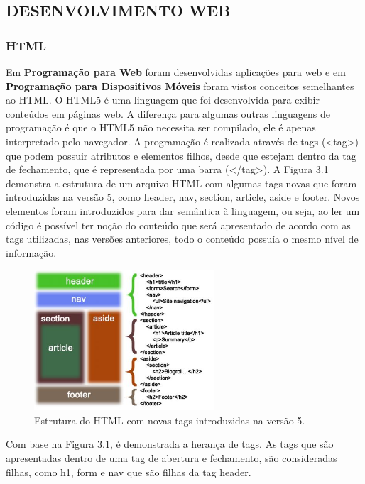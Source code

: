 \documentclass[
  12pt,				%
  openany,
  oneside,
  a4paper,			%
  english,			%
  brazil
]{article}
\numberwithin{figure}{section}
\numberwithin{table}{section}
\begin{document}
\subsection{DESENVOLVIMENTO WEB}

\subsubsection{HTML}

Em \textbf{Programação para Web} foram desenvolvidas aplicações para web e em \textbf{Programação para Dispositivos Móveis} foram vistos conceitos semelhantes ao HTML. O HTML5 é uma linguagem que foi desenvolvida para exibir conteúdos em páginas web. A diferença para algumas outras linguagens de programação é que o HTML5 não necessita ser compilado, ele é apenas interpretado pelo navegador. A programação é realizada através de tags (<tag>) que podem possuir atributos e elementos filhos, desde que estejam dentro da tag de fechamento, que é representada por uma barra (</tag>). A Figura 3.1 demonstra a estrutura de um arquivo HTML com algumas tags novas que foram introduzidas na versão 5, como header, nav, section, article, aside e footer. Novos elementos foram introduzidos para dar semântica à linguagem, ou seja, ao ler um código é possível ter noção do conteúdo que será apresentado de acordo com as tags utilizadas, nas versões anteriores, todo o conteúdo possuía o mesmo nível de informação.

\begin{figure}[!htb]
\centering
\includegraphics[width=0.6\textwidth]{figura31}
\caption{Estrutura do HTML com novas tags introduzidas na versão 5.}
\end{figure}

Com base na Figura 3.1, é demonstrada a herança de tags. As tags que são apresentadas dentro de uma tag de abertura e fechamento, são consideradas filhas, como h1, form e nav que são filhas da tag header.
\end{document}
